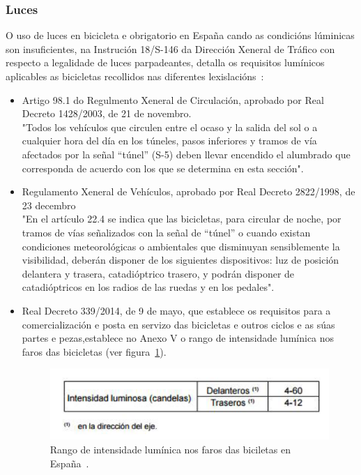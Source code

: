 \subsubsection{Luces}
O uso de luces en bicicleta e obrigatorio en España cando as condicións lúminicas son insuficientes, na Instrución 18/S-146 da Dirección Xeneral de Tráfico con respecto a legalidade de luces parpadeantes, detalla os requisitos lumínicos aplicables as bicicletas recollidos nas diferentes lexislacións~\cite{Instruccion18S146}:
\begin{itemize}
  \item Artigo  98.1  do  Regulmento  Xeneral  de Circulación, aprobado por Real Decreto 1428/2003, de 21 de novembro.\\
  "Todos los vehículos que circulen entre el ocaso y la salida del sol o a cualquier hora del día en los túneles, pasos inferiores y tramos de vía afectados por la señal “túnel” (S-5) deben llevar encendido el   alumbrado   que   corresponda   de   acuerdo   con   los   que   se determina en esta sección".
  \item  Regulamento Xeneral de Vehículos, aprobado por Real Decreto 2822/1998, de 23 decembro\\
  "En el artículo 22.4 se indica que las bicicletas, para circular de noche, por tramos   de   vías   señalizados   con   la   señal   de   “túnel”   o   cuando   existan condiciones  meteorológicas  o  ambientales  que  disminuyan  sensiblemente  la visibilidad,  deberán  disponer  de  los  siguientes  dispositivos: luz  de  posición delantera   y   trasera,   catadióptrico   trasero,   y   podrán   disponer   de catadióptricos en los radios de las ruedas y en los pedales".
  \item Real Decreto 339/2014, de 9 de mayo, que establece os requisitos para a comercialización e posta en servizo das bicicletas e outros ciclos e as súas partes e pezas,establece no Anexo V o rango de intensidade lumínica nos faros das bicicletas (ver figura~\ref{fig:lexislacion_luminica}).

  \begin{figure}[tbp]
    \centering
    \includegraphics[scale=0.6]{imaxes/lexislacion-luminica.png}
    \caption{Rango de intensidade lumínica nos faros das biciletas en España~\cite{Instruccion18S146}.}
    \label{fig:lexislacion_luminica}
  \end{figure}
\end{itemize}

